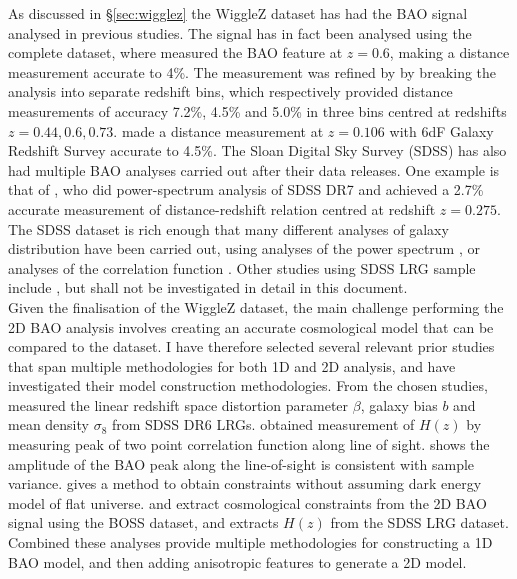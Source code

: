\documentclass[titlesmallcaps, examinerscopy, copyrightpage]{uqthesis}
\begin{document}
As discussed in \S\ref{sec:wigglez} the WiggleZ dataset has had the BAO signal analysed in previous studies. The signal has in fact been analysed using the complete dataset, where \citet{BlakeKazin2011} measured the BAO feature at $z=0.6$, making a distance measurement accurate to 4\%. The measurement was refined by  \citet{BlakeDavis2011} by breaking the analysis into separate redshift bins, which respectively provided distance measurements of accuracy 7.2\%, 4.5\% and 5.0\% in three bins centred at redshifts $z=0.44,0.6,0.73$. \citet{BeutlerBlake2011} made a distance measurement at $z=0.106$ with 6dF Galaxy Redshift Survey \cite[6dFGRS:][]{JonesRead2009} accurate to 4.5\%. The Sloan Digital Sky Survey (SDSS) has also had multiple BAO analyses carried out after their data releases. One example is that of \citet{PercivalReid2010}, who did power-spectrum analysis of SDSS DR7 and achieved a 2.7\% accurate measurement of distance-redshift relation centred at redshift $z=0.275$. The SDSS dataset is rich enough that many different analyses of galaxy distribution have been carried out, using analyses of the power spectrum \citep{TegmarkBlanton2004,Huetsi2005,BlakeCollister2007,Padmanabhan2007, PercivalCole2007,PercivalReid2010, ReidPercival2010}, or analyses of the correlation function \citep{EisensteinZehavi2005, Sanchez2009, OkumuraMatsubara2008, CabreGaztanaga2009, Martinez2009,KazinBlanton2010,ChuangWangHemantha2012}. Other studies using SDSS LRG sample include \citet{Huetsi2006, PercivalNichol2007,Sanchez2009, KazinBlanton2010}, but shall not be investigated in detail in this document.\\





Given the finalisation of the WiggleZ dataset, the main challenge performing the 2D BAO analysis involves creating an accurate cosmological model that can be compared to the dataset. I have therefore selected several relevant prior studies that span multiple methodologies for both 1D and 2D analysis, and have investigated their model construction methodologies. From the chosen studies, \citet{CabreGaztanaga2009} measured the linear redshift space distortion parameter $\beta$, galaxy bias $b$ and mean density $\sigma_8$ from SDSS DR6 LRGs. \citet{Gaztanaga2009} obtained measurement of $H(z)$ by measuring peak of two point correlation function along line of sight. \citet{KazinBlanton2010} shows the amplitude of the BAO peak along the line-of-sight is consistent with sample variance. \citet{ChuangWangHemantha2012} gives a method to obtain constraints without assuming dark energy model of flat universe. \citet{SanchezKazinBeutler2013} and \citet{Kazin2010} extract cosmological constraints from the 2D BAO signal using the BOSS dataset, and \citet{Gaztanaga2009} extracts $H(z)$ from the SDSS LRG dataset. Combined these analyses provide multiple methodologies for constructing a 1D BAO model, and then adding anisotropic features to generate a 2D model.
\end{document}
